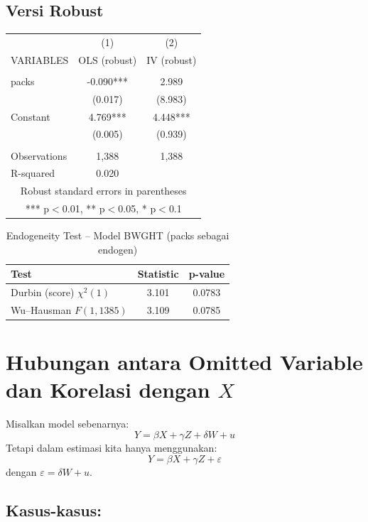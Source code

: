 \documentclass[]{article}
\begin{document}
\subsection*{Versi Robust}
\begin{tabular}{lcc} \hline
 & (1) & (2) \\
VARIABLES & OLS (robust) & IV (robust) \\ \hline
 &  &  \\
packs & -0.090*** & 2.989 \\
 & (0.017) & (8.983) \\
Constant & 4.769*** & 4.448*** \\
 & (0.005) & (0.939) \\
 &  &  \\
Observations & 1,388 & 1,388 \\
 R-squared & 0.020 &  \\ \hline
\multicolumn{3}{c}{ Robust standard errors in parentheses} \\
\multicolumn{3}{c}{ *** p$<$0.01, ** p$<$0.05, * p$<$0.1} \\
\end{tabular}

\begin{table}[htbp]\centering
\caption{Endogeneity Test -- Model BWGHT (packs sebagai endogen)}
\begin{tabular}{lcc}
\toprule
\textbf{Test} & \textbf{Statistic} & \textbf{p-value} \\
\midrule
Durbin (score) $\chi^2(1)$ & 3.101 & 0.0783 \\
Wu--Hausman $F(1,1385)$    & 3.109 & 0.0785 \\
\bottomrule
\end{tabular}
\end{table}
\section*{Hubungan antara Omitted Variable dan Korelasi dengan $X$}

Misalkan model sebenarnya:
\[
Y = \beta X + \gamma Z + \delta W + u
\]
Tetapi dalam estimasi kita hanya menggunakan:
\[
Y = \beta X + \gamma Z + \varepsilon
\]
dengan $\varepsilon = \delta W + u$.

\subsection*{Kasus-kasus:}
\end{document}
